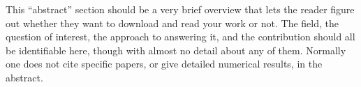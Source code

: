 This ``abstract'' section should be a very brief overview that lets the reader
figure out whether they want to download and read your work or not.
The field, the question of interest, the approach to answering it,
and the contribution should all be identifiable here,
though with almost no detail about any of them.
Normally one does not cite specific papers,
or give detailed numerical results, in the abstract.